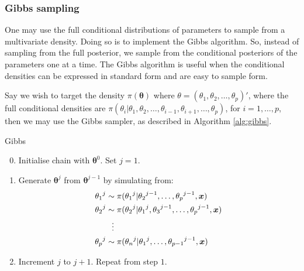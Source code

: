 \subsubsection{Gibbs sampling}
\label{sssec:gibbs_sampling}
One may use the full conditional distributions of parameters to sample from a multivariate density. Doing so is to implement the Gibbs algorithm. So, instead of sampling from the full posterior, we sample from the conditional posteriors of the parameters one at a time. The Gibbs algorithm is useful when the conditional densities can be expressed in standard form and are easy to sample form.

Say we wish to target the density $\pi(\bm{\theta})$ where $\theta = (\theta_1, \theta_2, \dots, \theta_p)'$, where the full conditional densities are $\pi(\theta_i|\theta_1, \theta_2, \dots, \theta_{i-1}, \theta_{i+1}, \dots, \theta_p)$, for $i=1,\dots,p$, then we may use the Gibbs sampler, as described in Algorithm \ref{alg:gibbs}.

\begin{algorithm}
\caption{Gibbs}
\label{alg:gibbs}
\begin{enumerate}
    \setcounter{enumi}{-1}
    \item Initialise chain with $\bm{\theta}^{0}$. Set $j=1$.
    \item Generate $\bm{\theta}^{j}$ from $\bm{\theta}^{j-1}$ by simulating from:
    \begin{align*}
            {\theta_1}^{j} &\sim \pi({\theta_1}^{j}|{\theta_2}^{j-1},\dots,{\theta_p}^{j-1},\bm{x})\\
            {\theta_2}^{j} &\sim \pi({\theta_2}^{j}|{\theta_1}^{j}, {\theta_3}^{j-1}, \dots, {\theta_p}^{j-1},\bm{x})\\
            &\hspace{0.25cm}\vdots \\
            {\theta_p}^{j} &\sim \pi({\theta_n}^{j}|{\theta_1}^{j}, \dots, {\theta_{p-1}}^{j-1},\bm{x})
    \end{align*}
    \item Increment $j$ to $j+1$. Repeat from step $1$.
\end{enumerate}
\end{algorithm}


